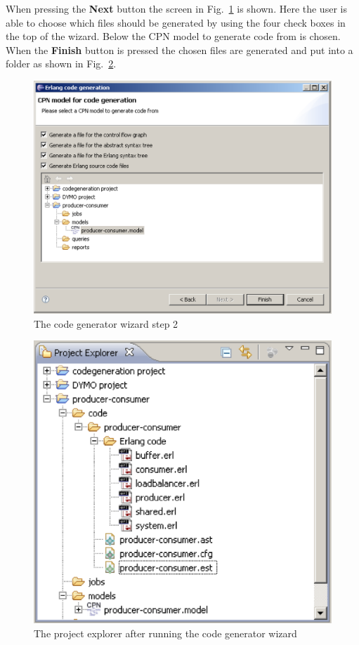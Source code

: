 When pressing the \textbf{Next} button the screen in Fig.~\ref{fig:cg2} is shown. Here the user is able to choose which files should be generated by using the four check boxes in the top of the wizard. Below the CPN model to generate code from is chosen. When the \textbf{Finish} button is pressed the chosen files are generated and put into a folder as shown in Fig.~\ref{fig:cgprojectexplorer}.

\begin{figure}[h!]
\centering
\includegraphics[scale=0.2]{techniques_and_tool/graphics/cg2.eps}
\caption{The code generator wizard step 2}
\label{fig:cg2}
\end{figure}

\begin{figure}[b!]
\centering
\includegraphics[scale=0.2]{techniques_and_tool/graphics/cgprojectexplorer.eps}
\caption{The project explorer after running the code generator wizard}
\label{fig:cgprojectexplorer}
\end{figure}

